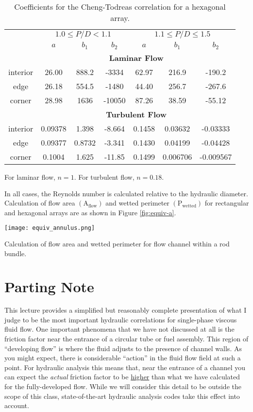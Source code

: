\begin{table}
\begin{tabular}{c c c c c c c}
\toprule
  & \multicolumn{3}{c}{$1.0 \le P/D < 1.1$} & \multicolumn{3}{c}{$1.1 \le P/D \le 1.5$} \\
  \cmidrule(lr){2-4} \cmidrule(lr){5-7}
 & $a$ & $b_1$ & $b_2$ & $a$ & $b_1$ & $b_2$ \\
  & \multicolumn{6}{c}{\textbf{Laminar Flow}} \\
interior  & 26.00 & 888.2 & -3334 & 62.97 & 216.9 & -190.2 \\
edge      & 26.18 & 554.5 & -1480 & 44.40 & 256.7 & -267.6 \\
corner    & 28.98 & 1636 & -10050 & 87.26 & 38.59 & -55.12 \\
& \multicolumn{6}{c}{\textbf{Turbulent Flow}} \\
interior & 0.09378 & 1.398 & -8.664 & 0.1458 & 0.03632 & -0.03333 \\
edge     & 0.09377 & 0.8732 & -3.341 & 0.1430 & 0.04199 & -0.04428 \\
corner   & 0.1004 & 1.625 & -11.85 & 0.1499 & 0.006706 & -0.009567 \\
\bottomrule
\end{tabular}
\caption{Coefficients for the Cheng-Todreas correlation for a hexagonal array.}
\label{tab:cheng-todreas-hex}
\end{table}
For laminar flow, $n=1$.  For turbulent flow, $n=0.18$.

In all cases, the Reynolds number is calculated relative to the hydraulic diameter.  Calculation of flow area $(\text{A}_{\text{flow}})$ and wetted perimeter $(\text{P}_{\text{wetted}})$ for rectangular and hexagonal arrays are as shown in Figure \ref{fig:equiv-a}.
\begin{marginfigure}
\texttt{[image: equiv\_annulus.png]}
\caption{Calculation of flow area and wetted perimeter for flow channel within a rod bundle.}
\label{fig:equiv-a}
\end{marginfigure}  

\section{Parting Note}
This lecture provides a simplified but reasonably complete presentation of what I judge to be the most important hydraulic correlations for single-phase viscous fluid flow.  One important phenomena that we have not discussed at all is the friction factor near the entrance of a circular tube or fuel assembly.  This region of ``developing flow'' is where the fluid adjusts to the presence of channel walls.  As you might expect, there is considerable ``action'' in the fluid flow field at such a point.  For hydraulic analysis this means that, near the entrance of a channel you can expect the \emph{actual} friction factor to be \underline{higher} than what we have calculated for the fully-developed flow.  While we will consider this detail to be outside the scope of this class, state-of-the-art hydraulic analysis codes take this effect into account.

